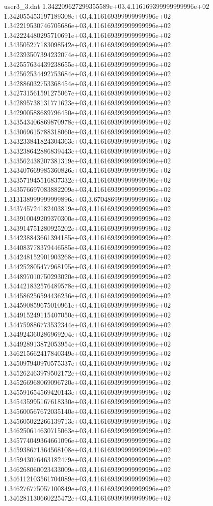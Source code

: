 \begin{filecontents}{user3_3.dat}
1.342209627299355589e+03,4.116169399999999996e+02
1.342055453197189308e+03,4.116169399999999996e+02
1.342219530746705686e+03,4.116169399999999996e+02
1.342224480295710691e+03,4.116169399999999996e+02
1.343505277183098542e+03,4.116169399999999996e+02
1.342393507394232074e+03,4.116169399999999996e+02
1.342557634439238655e+03,4.116169399999999996e+02
1.342562534492753684e+03,4.116169399999999996e+02
1.342886032753368454e+03,4.116169399999999996e+02
1.342731561591275067e+03,4.116169399999999996e+02
1.342895738131771623e+03,4.116169399999999996e+02
1.342900588689796450e+03,4.116169399999999996e+02
1.343543406869870978e+03,4.116169399999999996e+02
1.343069615788318060e+03,4.116169399999999996e+02
1.343233841824304363e+03,4.116169399999999996e+02
1.343238642886839443e+03,4.116169399999999996e+02
1.343562438207381319e+03,4.116169399999999996e+02
1.343407669985360826e+03,4.116169399999999996e+02
1.343571945516837332e+03,4.116169399999999996e+02
1.343576697083882209e+03,4.116169399999999996e+02
1.313138999999999896e+03,3.670486999999999966e+02
1.343745724182403819e+03,4.116169399999999996e+02
1.343910049209370300e+03,4.116169399999999996e+02
1.343914751280925202e+03,4.116169399999999996e+02
1.344238843661394185e+03,4.116169399999999996e+02
1.344083778379446585e+03,4.116169399999999996e+02
1.344248152901903268e+03,4.116169399999999996e+02
1.344252805477968195e+03,4.116169399999999996e+02
1.344897010750293020e+03,4.116169399999999996e+02
1.344421832576489578e+03,4.116169399999999996e+02
1.344586256594436236e+03,4.116169399999999996e+02
1.344590859675010961e+03,4.116169399999999996e+02
1.344915249115407050e+03,4.116169399999999996e+02
1.344759886773532344e+03,4.116169399999999996e+02
1.344924360286969204e+03,4.116169399999999996e+02
1.344928913872053954e+03,4.116169399999999996e+02
1.346215662417840349e+03,4.116169399999999996e+02
1.345097940970575337e+03,4.116169399999999996e+02
1.345262463979502172e+03,4.116169399999999996e+02
1.345266968069096720e+03,4.116169399999999996e+02
1.345591654569420143e+03,4.116169399999999996e+02
1.345435995167618330e+03,4.116169399999999996e+02
1.345600567672035140e+03,4.116169399999999996e+02
1.345605022266139713e+03,4.116169399999999996e+02
1.346250614630715063e+03,4.116169399999999996e+02
1.345774049364661096e+03,4.116169399999999996e+02
1.345938671364568108e+03,4.116169399999999996e+02
1.345943076463182479e+03,4.116169399999999996e+02
1.346268060023433009e+03,4.116169399999999996e+02
1.346112103561704089e+03,4.116169399999999996e+02
1.346276775057100849e+03,4.116169399999999996e+02
1.346281130660225472e+03,4.116169399999999996e+02

\end{filecontents}

